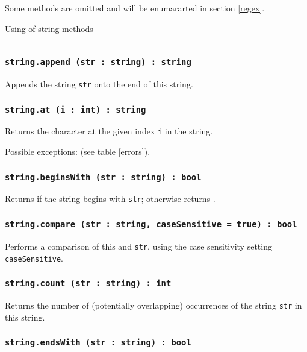 Some methods are omitted and will be enumararted in section \ref{regex}.

\newpage
Using of string methods —
\inputminted[linenos]{icl}{../sources/stringmethods.icL}

\subsubsection{\texttt{string.append (str : string) : string}}

Appends the string \texttt{str} onto the end of this string.

\subsubsection{\texttt{string.at (i : int) : string}}

Returns the character at the given index \texttt{i} in the string.

Possible exceptions:  (see table \ref{errors}).

\subsubsection{\texttt{string.beginsWith (str : string) : bool}}

Returns \true{} if the string begins with \texttt{str}; otherwise returns \false.

\subsubsection{\texttt{string.compare (str : string, caseSensitive = true) : bool}}

Performs a comparison of this and \texttt{str}, using the case sensitivity setting \texttt{caseSensitive}.

\subsubsection{\texttt{string.count (str : string) : int}}

Returns the number of (potentially overlapping) occurrences of the string \texttt{str} in this string.

\subsubsection{\texttt{string.endsWith (str : string) : bool}}

